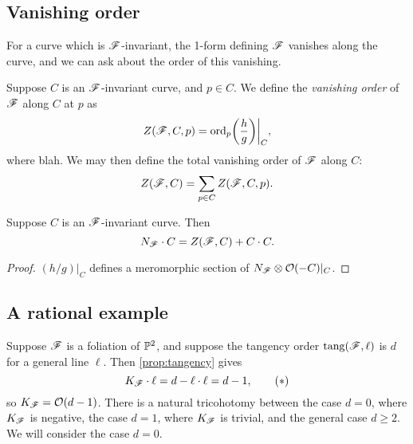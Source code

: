
\subsection{Vanishing order}

For a curve which is $\scrF$-invariant, the 1-form defining $\scrF$ vanishes
along the curve, and we can ask about the order of this vanishing.

\begin{definition}
    Suppose $C$ is an $\scrF$-invariant curve, and $p\in C$. We define the
    \emph{vanishing order} of $\scrF$ along $C$ at $p$ as
    \begin{equation*}
        Z(\scrF,C,p) = \ord_p\biggl(\frac{h}{g}\biggr)\bigg|_C,
    \end{equation*}
    where blah. We may then define the total vanishing order of $\scrF$ along
    $C$:
    \begin{equation*}
        Z(\scrF,C) = \sum_{p\in C}Z(\scrF,C,p).
    \end{equation*}
\end{definition}




\begin{proposition}
    Suppose $C$ is an $\scrF$-invariant curve. Then
    \begin{equation*}
        N_\scrF\cdot C = Z(\scrF,C) + C\cdot C.
    \end{equation*}
\end{proposition}

\begin{proof}
    $(h/g)|_C$ defines a meromorphic section of $N_\scrF\otimes\O(-C)|_C$.
\end{proof}


\subsection{A rational example}\label{sec:pencil}

Suppose $\scrF$ is a foliation of $\P^2$, and suppose the tangency order
$\tang(\scrF,\ell)$ is $d$ for a general line $\ell$. Then \cref{prop:tangency}
gives
\begin{equation*}
    K_\scrF\cdot\ell = d - \ell\cdot\ell = d - 1, \tag{$*$}
\end{equation*}
so $K_\scrF=\O(d-1)$. There is a natural tricohotomy between the case $d=0$,
where $K_\scrF$ is negative, the case $d=1$, where $K_\scrF$ is trivial, and the
general case $d\ge2$. We will consider the case $d=0$.


